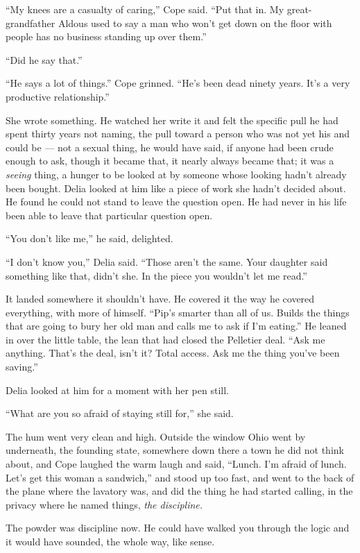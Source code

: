 \documentclass[11pt,openany]{book}
\newcommand{\scenebreak}{\par\vspace{0.5\baselineskip}\begin{center}\textasteriskcentered\quad\textasteriskcentered\quad\textasteriskcentered\end{center}\vspace{0.5\baselineskip}\par}
\begin{document}
``My knees are a casualty of caring,'' Cope said. ``Put that in. My great-grandfather Aldous used to say a man who won't get down on the floor with people has no business standing up over them.''

``Did he say that.''

``He says a lot of things.'' Cope grinned. ``He's been dead ninety years. It's a very productive relationship.''

She wrote something. He watched her write it and felt the specific pull he had spent thirty years not naming, the pull toward a person who was not yet his and could be --- not a sexual thing, he would have said, if anyone had been crude enough to ask, though it became that, it nearly always became that; it was a \textit{seeing} thing, a hunger to be looked at by someone whose looking hadn't already been bought. Delia looked at him like a piece of work she hadn't decided about. He found he could not stand to leave the question open. He had never in his life been able to leave that particular question open.

``You don't like me,'' he said, delighted.

``I don't know you,'' Delia said. ``Those aren't the same. Your daughter said something like that, didn't she. In the piece you wouldn't let me read.''

It landed somewhere it shouldn't have. He covered it the way he covered everything, with more of himself. ``Pip's smarter than all of us. Builds the things that are going to bury her old man and calls me to ask if I'm eating.'' He leaned in over the little table, the lean that had closed the Pelletier deal. ``Ask me anything. That's the deal, isn't it? Total access. Ask me the thing you've been saving.''

Delia looked at him for a moment with her pen still.

``What are you so afraid of staying still for,'' she said.

The hum went very clean and high. Outside the window Ohio went by underneath, the founding state, somewhere down there a town he did not think about, and Cope laughed the warm laugh and said, ``Lunch. I'm afraid of lunch. Let's get this woman a sandwich,'' and stood up too fast, and went to the back of the plane where the lavatory was, and did the thing he had started calling, in the privacy where he named things, \textit{the discipline.}


\scenebreak


The powder was discipline now. He could have walked you through the logic and it would have sounded, the whole way, like sense.
\end{document}
